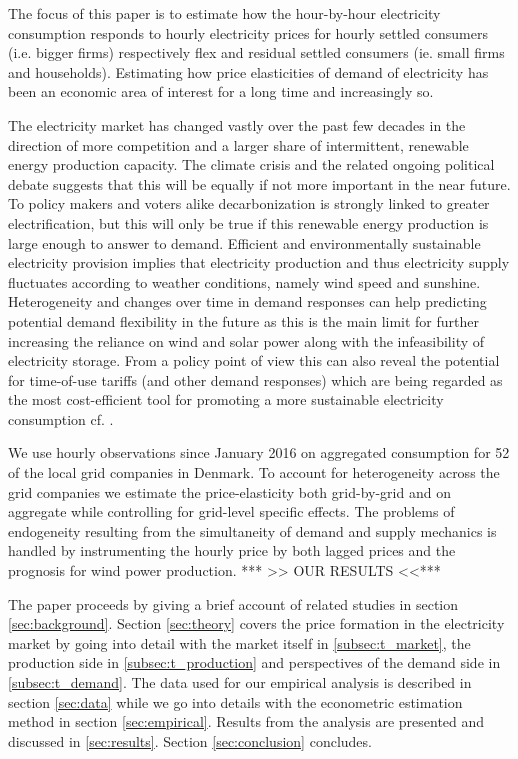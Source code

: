 \label{sec:intro}
The focus of this paper is to estimate how the hour-by-hour electricity consumption responds to hourly electricity prices for hourly settled consumers (i.e. bigger firms) respectively flex and residual settled consumers (ie. small firms and households). Estimating how price elasticities of demand of electricity has been an economic area of interest for a long time and increasingly so.
\medskip 

The electricity market has changed vastly over the past few decades in the direction of more competition and a larger share of intermittent, renewable energy production capacity. The climate crisis and the related ongoing political debate suggests that this will be equally if not more important in the near future. To policy makers and voters alike decarbonization is strongly linked to greater electrification, but this will only be true if this renewable energy production is large enough to answer to demand.  Efficient and environmentally sustainable electricity provision implies that electricity production and thus electricity supply fluctuates according to weather conditions, namely wind speed and sunshine. Heterogeneity and changes over time in demand responses can help predicting potential demand flexibility in the future as this is the main limit for further increasing the reliance on wind and solar power along with the infeasibility of electricity storage. From a policy point of view this can also reveal the potential for time-of-use tariffs (and other demand responses) which are being regarded as the most cost-efficient tool for promoting a more sustainable electricity consumption cf. \citet{albadi2008summary}.
\medskip 

 We use hourly observations since January 2016 on aggregated consumption for 52 of the local grid companies in Denmark. To account for heterogeneity across the grid companies we estimate the price-elasticity both grid-by-grid and on aggregate while controlling for grid-level specific effects. The problems of endogeneity resulting from the simultaneity of demand and supply mechanics is handled by instrumenting the hourly price by both lagged prices and the prognosis for wind power production. *** >> OUR RESULTS <<***
\medskip 

The paper proceeds by giving a brief account of related studies in section \ref{sec:background}. Section \ref{sec:theory} covers the price formation in the electricity market by going into detail with the market itself in \ref{subsec:t_market}, the production side in \ref{subsec:t_production} and perspectives of the demand side in \ref{subsec:t_demand}. The data used for our empirical analysis is described in section \ref{sec:data} while we go into details with the econometric estimation method in section \ref{sec:empirical}. Results from the analysis are presented and discussed in \ref{sec:results}. Section \ref{sec:conclusion} concludes.
